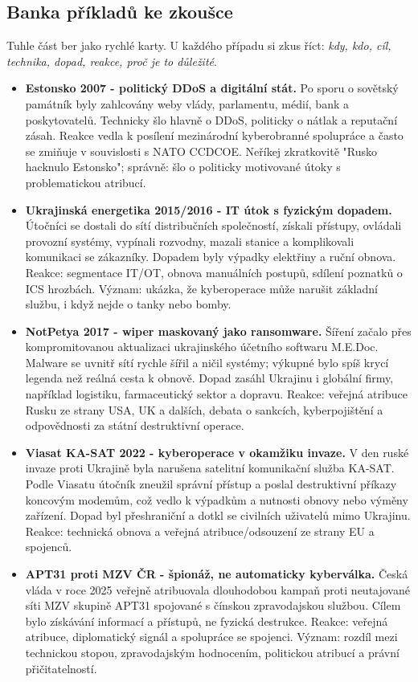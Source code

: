 \subsection*{Banka příkladů ke zkoušce}
Tuhle část ber jako rychlé karty. U každého případu si zkus říct: \emph{kdy, kdo, cíl, technika, dopad, reakce, proč je to důležité}.
\begin{itemize}
  \item \textbf{Estonsko 2007 - politický DDoS a digitální stát.} Po sporu o sovětský památník byly zahlcovány weby vlády, parlamentu, médií, bank a poskytovatelů. Technicky šlo hlavně o DDoS, politicky o nátlak a reputační zásah. Reakce vedla k posílení mezinárodní kyberobranné spolupráce a často se zmiňuje v souvislosti s NATO CCDCOE. Neříkej zkratkovitě "Rusko hacknulo Estonsko"; správně: šlo o politicky motivované útoky s problematickou atribucí.
  \item \textbf{Ukrajinská energetika 2015/2016 - IT útok s fyzickým dopadem.} Útočníci se dostali do sítí distribučních společností, získali přístupy, ovládali provozní systémy, vypínali rozvodny, mazali stanice a komplikovali komunikaci se zákazníky. Dopadem byly výpadky elektřiny a ruční obnova. Reakce: segmentace IT/OT, obnova manuálních postupů, sdílení poznatků o ICS hrozbách. Význam: ukázka, že kyberoperace může narušit základní službu, i když nejde o tanky nebo bomby.
  \item \textbf{NotPetya 2017 - wiper maskovaný jako ransomware.} Šíření začalo přes kompromitovanou aktualizaci ukrajinského účetního softwaru M.E.Doc. Malware se uvnitř sítí rychle šířil a ničil systémy; výkupné bylo spíš krycí legenda než reálná cesta k obnově. Dopad zasáhl Ukrajinu i globální firmy, například logistiku, farmaceutický sektor a dopravu. Reakce: veřejná atribuce Rusku ze strany USA, UK a dalších, debata o sankcích, kyberpojištění a odpovědnosti za státní destruktivní operace.
  \item \textbf{Viasat KA-SAT 2022 - kyberoperace v okamžiku invaze.} V den ruské invaze proti Ukrajině byla narušena satelitní komunikační služba KA-SAT. Podle Viasatu útočník zneužil správní přístup a poslal destruktivní příkazy koncovým modemům, což vedlo k výpadkům a nutnosti obnovy nebo výměny zařízení. Dopad byl přeshraniční a dotkl se civilních uživatelů mimo Ukrajinu. Reakce: technická obnova a veřejná atribuce/odsouzení ze strany EU a spojenců.
  \item \textbf{APT31 proti MZV ČR - špionáž, ne automaticky kyberválka.} Česká vláda v roce 2025 veřejně atribuovala dlouhodobou kampaň proti neutajované síti MZV skupině APT31 spojované s čínskou zpravodajskou službou. Cílem bylo získávání informací a přístupů, ne fyzická destrukce. Reakce: veřejná atribuce, diplomatický signál a spolupráce se spojenci. Význam: rozdíl mezi technickou stopou, zpravodajským hodnocením, politickou atribucí a právní přičitatelností.

\end{itemize}
